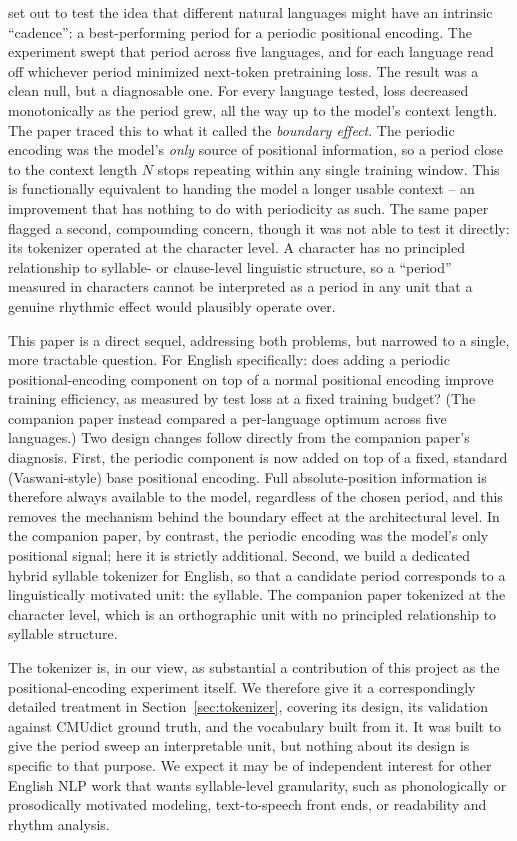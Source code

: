 \documentclass[11pt]{article}
\begin{document}
\citet{nabijou2026} set out to test the idea that different natural languages might have an intrinsic ``cadence'': a best-performing period for a periodic positional encoding. The experiment swept that period across five languages, and for each language read off whichever period minimized next-token pretraining loss. The result was a clean null, but a diagnosable one. For every language tested, loss decreased monotonically as the period grew, all the way up to the model's context length. The paper traced this to what it called the \emph{boundary effect}. The periodic encoding was the model's \emph{only} source of positional information, so a period close to the context length $N$ stops repeating within any single training window. This is functionally equivalent to handing the model a longer usable context -- an improvement that has nothing to do with periodicity as such. The same paper flagged a second, compounding concern, though it was not able to test it directly: its tokenizer operated at the character level. A character has no principled relationship to syllable- or clause-level linguistic structure, so a ``period'' measured in characters cannot be interpreted as a period in any unit that a genuine rhythmic effect would plausibly operate over.

This paper is a direct sequel, addressing both problems, but narrowed to a single, more tractable question. For English specifically: does adding a periodic positional-encoding component on top of a normal positional encoding improve training efficiency, as measured by test loss at a fixed training budget? (The companion paper instead compared a per-language optimum across five languages.) Two design changes follow directly from the companion paper's diagnosis. First, the periodic component is now added on top of a fixed, standard (Vaswani-style) base positional encoding. Full absolute-position information is therefore always available to the model, regardless of the chosen period, and this removes the mechanism behind the boundary effect at the architectural level. In the companion paper, by contrast, the periodic encoding was the model's only positional signal; here it is strictly additional. Second, we build a dedicated hybrid syllable tokenizer for English, so that a candidate period corresponds to a linguistically motivated unit: the syllable. The companion paper tokenized at the character level, which is an orthographic unit with no principled relationship to syllable structure.

The tokenizer is, in our view, as substantial a contribution of this project as the positional-encoding experiment itself. We therefore give it a correspondingly detailed treatment in Section~\ref{sec:tokenizer}, covering its design, its validation against CMUdict ground truth, and the vocabulary built from it. It was built to give the period sweep an interpretable unit, but nothing about its design is specific to that purpose. We expect it may be of independent interest for other English NLP work that wants syllable-level granularity, such as phonologically or prosodically motivated modeling, text-to-speech front ends, or readability and rhythm analysis.
\end{document}
